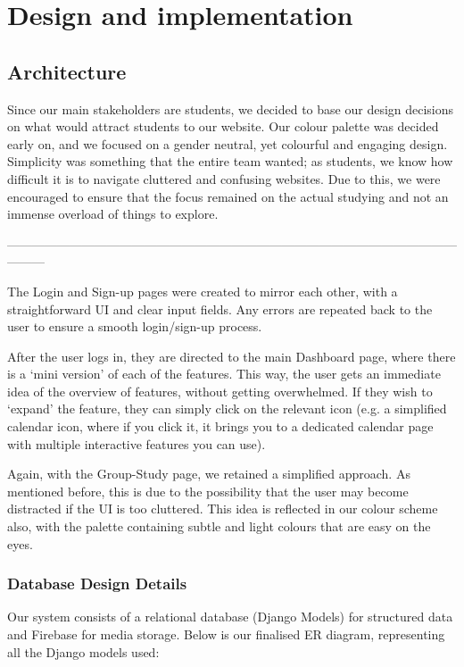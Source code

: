 \chapter{Design and implementation}
\label{chap:design-and-implementation}

\section{Architecture}
\label{sect:architecture}

Since our main stakeholders are students, we decided to base our design decisions on what would attract students to our website. Our colour palette was decided early on, and we focused on a gender neutral, yet colourful and engaging design. Simplicity was something that the entire team wanted; as students, we know how difficult it is to navigate cluttered and confusing websites. Due to this, we were encouraged to ensure that the focus remained on the actual studying and not an immense overload of things to explore. 

---------------------------------------------------------------------------------------------------------------------

The Login and Sign-up pages were created to mirror each other, with a straightforward UI and clear input fields. Any errors are repeated back to the user to ensure a smooth login/sign-up process. 

After the user logs in, they are directed to the main Dashboard page, where there is a ‘mini version’ of each of the features. This way, the user gets an immediate idea of the overview of features, 
without getting overwhelmed. If they wish to ‘expand’ the feature, they can simply click on the relevant icon (e.g. a simplified calendar icon, where if you click it, it brings you to a dedicated calendar page with multiple interactive features you can use). 

Again, with the Group-Study page, we retained a simplified approach. As mentioned before, this is due to the possibility that the user may become distracted if the UI is too cluttered. This idea is reflected in our colour scheme also, with the palette containing subtle and light colours that are easy on the eyes.


\subsection{Database Design Details}

Our system consists of a relational database (Django Models) for structured data and Firebase for media storage. Below is our finalised ER diagram, representing all the Django models used:

